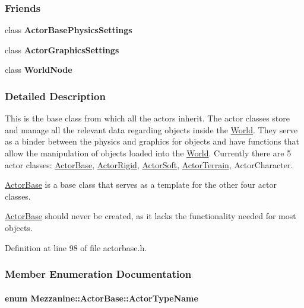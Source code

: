 \subsubsection*{Friends}
\begin{DoxyCompactItemize}
\item 
\hypertarget{classMezzanine_1_1ActorBase_ad56afa2bffce8b552583041f21297874}{
class {\bfseries ActorBasePhysicsSettings}}
\label{classMezzanine_1_1ActorBase_ad56afa2bffce8b552583041f21297874}

\item 
\hypertarget{classMezzanine_1_1ActorBase_a01f5bcaf4807085e756d9c03b3eb8d9d}{
class {\bfseries ActorGraphicsSettings}}
\label{classMezzanine_1_1ActorBase_a01f5bcaf4807085e756d9c03b3eb8d9d}

\item 
\hypertarget{classMezzanine_1_1ActorBase_a1cacd07efb11226da49a7c80569b18e8}{
class {\bfseries WorldNode}}
\label{classMezzanine_1_1ActorBase_a1cacd07efb11226da49a7c80569b18e8}

\end{DoxyCompactItemize}


\subsubsection{Detailed Description}
This is the base class from which all the actors inherit. The actor classes store and manage all the relevant data regarding objects inside the \hyperlink{classMezzanine_1_1World}{World}. They serve as a binder between the physics and graphics for objects and have functions that allow the manipulation of objects loaded into the \hyperlink{classMezzanine_1_1World}{World}. Currently there are 5 actor classes: \hyperlink{classMezzanine_1_1ActorBase}{ActorBase}, \hyperlink{classMezzanine_1_1ActorRigid}{ActorRigid}, \hyperlink{classMezzanine_1_1ActorSoft}{ActorSoft}, \hyperlink{classMezzanine_1_1ActorTerrain}{ActorTerrain}, ActorCharacter. \par
 \hyperlink{classMezzanine_1_1ActorBase}{ActorBase} is a base class that serves as a template for the other four actor classes. \par
 \hyperlink{classMezzanine_1_1ActorBase}{ActorBase} should never be created, as it lacks the functionality needed for most objects. 

Definition at line 98 of file actorbase.h.



\subsubsection{Member Enumeration Documentation}
\hypertarget{classMezzanine_1_1ActorBase_a98e1b66ce4973b01abb6d9b858398eb6}{
\paragraph[{ActorTypeName}]{\setlength{\rightskip}{0pt plus 5cm}enum {\bf Mezzanine::ActorBase::ActorTypeName}}\hfill}
\label{classMezzanine_1_1ActorBase_a98e1b66ce4973b01abb6d9b858398eb6}


